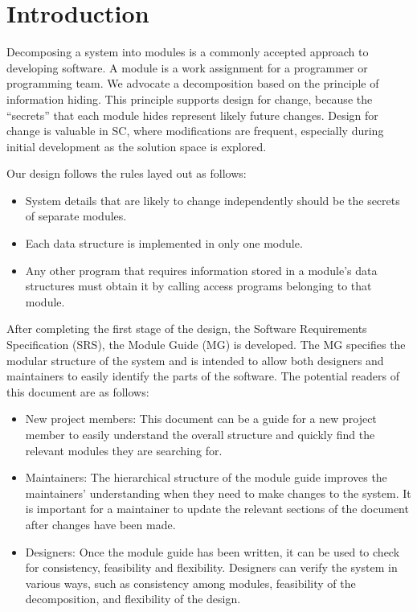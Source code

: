 \documentclass[12pt, titlepage]{article}
\begin{document}
\newpage

\tableofcontents

\listoftables

\listoffigures

\newpage


\section{Introduction}

Decomposing a system into modules is a commonly accepted approach to developing
software.  A module is a work assignment for a programmer or programming
team.  We advocate a decomposition
based on the principle of information hiding.  This
principle supports design for change, because the ``secrets'' that each module
hides represent likely future changes.  Design for change is valuable in SC,
where modifications are frequent, especially during initial development as the
solution space is explored.  

Our design follows the rules layed out as follows:
\begin{itemize}
\item System details that are likely to change independently should be the
  secrets of separate modules.
\item Each data structure is implemented in only one module.
\item Any other program that requires information stored in a module's data
  structures must obtain it by calling access programs belonging to that module.
\end{itemize}

After completing the first stage of the design, the Software Requirements
Specification (SRS), the Module Guide (MG) is developed. The MG
specifies the modular structure of the system and is intended to allow both
designers and maintainers to easily identify the parts of the software.  The
potential readers of this document are as follows:

\begin{itemize}
\item New project members: This document can be a guide for a new project member
  to easily understand the overall structure and quickly find the
  relevant modules they are searching for.
\item Maintainers: The hierarchical structure of the module guide improves the
  maintainers' understanding when they need to make changes to the system. It is
  important for a maintainer to update the relevant sections of the document
  after changes have been made.
\item Designers: Once the module guide has been written, it can be used to
  check for consistency, feasibility and flexibility. Designers can verify the
  system in various ways, such as consistency among modules, feasibility of the
  decomposition, and flexibility of the design.
\end{itemize}
\end{document}
